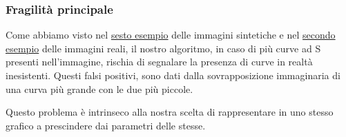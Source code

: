 \subsubsection{Fragilità principale}
Come abbiamo visto nel \hyperref[fig:sintentica_ostinelli_6]{sesto esempio} delle immagini sintetiche e nel \hyperref[fig:reale_ostinelli_2]{secondo esempio} delle immagini reali, il nostro algoritmo, in caso di più curve ad S presenti nell'immagine, rischia di segnalare la presenza di curve in realtà inesistenti. Questi falsi positivi, sono dati dalla sovrapposizione immaginaria di una curva più grande con le due più piccole.\par
Questo problema è intrinseco alla nostra scelta di rappresentare in uno stesso grafico a prescindere dai parametri delle stesse.